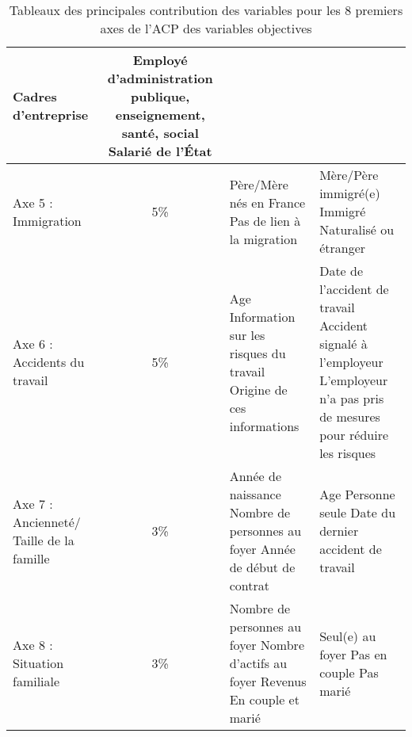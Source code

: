 \documentclass[11pt,fleqn,openany,frenchb]{book} %
\begin{document}
\begin{table}[!h]
\begin{tabular}{|p{3cm}|c|p{4.5cm}|p{4.5cm}|}
    \newline Cadres d'entreprise
    & Employé d'administration publique, enseignement, santé, social
    \newline Salarié de l'\'Etat \\
    \hline
    Axe 5 : Immigration & 5\%
    & Père/Mère nés en France
    \newline Pas de lien à la migration 
    & Mère/Père immigré(e)
    \newline Immigré
    \newline Naturalisé ou étranger\\
    \hline  
    Axe 6 : Accidents du travail & 5\%
    & Age
    \newline Information sur les risques du travail
    \newline Origine de ces informations
    & Date de l'accident de travail
    \newline Accident signalé à l'employeur
    \newline L'employeur n'a pas pris de mesures pour réduire les risques \\
    \hline
    Axe 7 : Ancienneté/ Taille de la famille & 3\%  %
    & Année de naissance
    \newline Nombre de personnes au foyer
    \newline Année de début de contrat
    & Age 
    \newline Personne seule
    \newline Date du dernier accident de travail \\
    \hline
    Axe 8 : Situation familiale & 3\%
    & Nombre de personnes au foyer 
    \newline Nombre d'actifs au foyer 
    \newline Revenus
    \newline En couple et marié
    & Seul(e) au foyer
    \newline Pas en couple
    \newline Pas marié \\
    \hline

\end{tabular}%
\caption{Tableaux des principales contribution des variables pour les 8 premiers axes de l’ACP des variables objectives}
\label{tab:ACPobj}
\end{table}
\end{document}
